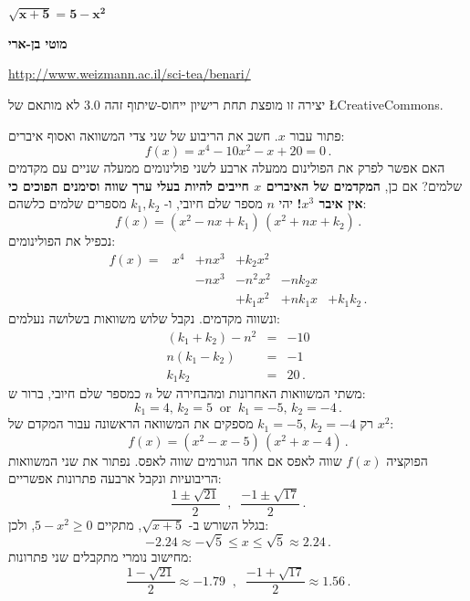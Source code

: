 \documentclass[12pt,a4paper]{article}
\begin{document}
\thispagestyle{empty}

\begin{center}
\textbf{\LARGE $\mathbf{\sqrt{x+5}=5-x^2}$}

\bigskip


\textbf{\Large מוטי בן-ארי}

\bigskip

\url{http://www.weizmann.ac.il/sci-tea/benari/}

\bigskip

יצירה זו מופצת תחת רישיון ייחוס-שיתוף זהה
$3.0$
לא מותאם של
\L{CreativeCommons}.
\end{center}

\bigskip
\bigskip

פתור עבור
$x$.
חשב את הריבוע של שני צדי המשוואה ואסוף איברים:
\[
f(x) = x^4 - 10 x^2 - x + 20 = 0\,.
\]
האם אפשר לפרק את הפולינום ממעלה ארבע לשני פולינומים ממעלה שניים עם מקדמים שלמים? אם כן,
\textbf{
המקדמים של האיברים
$x$
חייבים להיות בעלי ערך שווה וסימנים הפוכים כי אין איבר
$x^3$!
}
יהי
$n$
מספר שלם חיובי, ו-
$k_1,k_2$
מספרים שלמים כלשהם:
\[
f(x) = (x^2 - nx + k_1)\, (x^2 + nx + k_2)\,.
\]
נכפיל את הפולינומים:
\[
\renewcommand{\arraystretch}{1.2}
\begin{array}{rrrrrr}
f(x) = &x^4 & + nx^3 & + k_2 x^2\\
&& -nx^3 &- n^2x^2 &-nk_2x\\
&&&+k_1x^2 &+ nk_1x &+ k_1k_2\,.
\end{array}
\]
ונשווה מקדמים. נקבל שלוש משוואות בשלושה נעלמים:
\begin{eqnarray*}
(k_1+k_2)-n^2 &=& -10\\
n(k_1-k_2) &=& -1\\
k_1k_2 &=& 20\,.
\end{eqnarray*}
משתי המשוואות האחרונות ומהבחירה של
$n$
כמספר שלם חיובי, ברור ש:
\[
k_1=4,\,k_2=5  \;\;\textrm{or} \;\; k_1=-5,\, k_2=-4\,.
\]
רק 
$k_1=-5,\, k_2=-4$
מספקים את המשוואה הראשונה עבור המקדם של
$x^2$:
\[
f(x) = (x^2 - x - 5)\, (x^2 + x - 4)\,.
\]
הפוקציה
$f(x)$
שווה לאפס אם אחד הגורמים שווה לאפס. נפתור את שני המשוואות הריבועיות ונקבל ארבעה פתרונות אפשריים:
\[
\frac{1\pm\sqrt{21}}{2}  \;\;,\;\; \frac{-1\pm\sqrt{17}}{2} \,.
\]
בגלל השורש ב-
$\sqrt{x+5}$,
מתקיים
$5-x^2\geq 0$,
ולכן:
\[
-2.24\approx-\sqrt{5}\leq x \leq \sqrt{5}\approx 2.24\,.
\]
מחישוב נומרי מתקבלים שני פתרונות:
\[
\frac{1-\sqrt{21}}{2} \approx -1.79 \;\;,\;\; \frac{-1+\sqrt{17}}{2}\approx 1.56 \,.
\]
\end{document}
